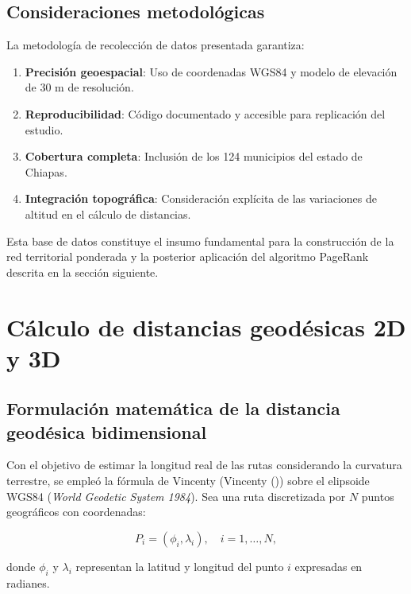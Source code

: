 \documentclass[
  spanish,
  us-letterpaper,
]{scrreprt}
\providecommand{\tightlist}{%
  \setlength{\itemsep}{0pt}\setlength{\parskip}{0pt}}
\numberwithin{equation}{section}
\begin{document}
\subsection{Consideraciones
metodológicas}\label{consideraciones-metodoluxf3gicas}

La metodología de recolección de datos presentada garantiza:

\begin{enumerate}
\def\labelenumi{\arabic{enumi}.}
\tightlist
\item
  \textbf{Precisión geoespacial}: Uso de coordenadas WGS84 y modelo de
  elevación de 30 m de resolución.
\item
  \textbf{Reproducibilidad}: Código documentado y accesible para
  replicación del estudio.
\item
  \textbf{Cobertura completa}: Inclusión de los 124 municipios del
  estado de Chiapas.
\item
  \textbf{Integración topográfica}: Consideración explícita de las
  variaciones de altitud en el cálculo de distancias.
\end{enumerate}

Esta base de datos constituye el insumo fundamental para la construcción
de la red territorial ponderada y la posterior aplicación del algoritmo
PageRank descrita en la sección siguiente.

\section{Cálculo de distancias geodésicas 2D y
3D}\label{sec-distancias3d}

\subsection{Formulación matemática de la distancia geodésica
bidimensional}\label{formulaciuxf3n-matemuxe1tica-de-la-distancia-geoduxe9sica-bidimensional}

Con el objetivo de estimar la longitud real de las rutas considerando la
curvatura terrestre, se empleó la fórmula de Vincenty (Vincenty
()) sobre el elipsoide WGS84
(\emph{World Geodetic System 1984}). Sea una ruta discretizada por \(N\)
puntos geográficos con coordenadas:

\[
P_i = (\phi_i, \lambda_i), \quad i = 1, \dots, N,
\]

donde \(\phi_i\) y \(\lambda_i\) representan la latitud y longitud del
punto \(i\) expresadas en radianes.
\end{document}

